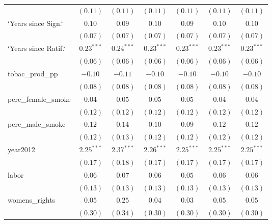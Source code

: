 \begin{table}[!h]
\begin{center}
\begin{tabular}{l c c c c c c }
                        & $(0.11)$     & $(0.11)$     & $(0.11)$     & $(0.11)$     & $(0.11)$     & $(0.11)$     \\
`Years since Sign.`     & $0.10$       & $0.09$       & $0.10$       & $0.09$       & $0.10$       & $0.10$       \\
                        & $(0.07)$     & $(0.07)$     & $(0.07)$     & $(0.07)$     & $(0.07)$     & $(0.07)$     \\
`Years since Ratif.`    & $0.23^{***}$ & $0.24^{***}$ & $0.23^{***}$ & $0.23^{***}$ & $0.23^{***}$ & $0.23^{***}$ \\
                        & $(0.06)$     & $(0.06)$     & $(0.06)$     & $(0.06)$     & $(0.06)$     & $(0.06)$     \\
tobac\_prod\_pp         & $-0.10$      & $-0.11$      & $-0.10$      & $-0.10$      & $-0.10$      & $-0.10$      \\
                        & $(0.08)$     & $(0.08)$     & $(0.08)$     & $(0.08)$     & $(0.08)$     & $(0.08)$     \\
perc\_female\_smoke     & $0.04$       & $0.05$       & $0.05$       & $0.05$       & $0.04$       & $0.04$       \\
                        & $(0.12)$     & $(0.12)$     & $(0.12)$     & $(0.12)$     & $(0.12)$     & $(0.12)$     \\
perc\_male\_smoke       & $0.12$       & $0.14$       & $0.10$       & $0.09$       & $0.12$       & $0.12$       \\
                        & $(0.12)$     & $(0.13)$     & $(0.12)$     & $(0.12)$     & $(0.12)$     & $(0.12)$     \\
year2012                & $2.25^{***}$ & $2.37^{***}$ & $2.26^{***}$ & $2.25^{***}$ & $2.25^{***}$ & $2.25^{***}$ \\
                        & $(0.17)$     & $(0.18)$     & $(0.17)$     & $(0.17)$     & $(0.17)$     & $(0.17)$     \\
labor                   & $0.06$       & $0.07$       & $0.06$       & $0.05$       & $0.06$       & $0.06$       \\
                        & $(0.13)$     & $(0.13)$     & $(0.13)$     & $(0.13)$     & $(0.13)$     & $(0.13)$     \\
womens\_rights          & $0.05$       & $0.25$       & $0.04$       & $0.03$       & $0.05$       & $0.05$       \\
                        & $(0.30)$     & $(0.34)$     & $(0.30)$     & $(0.30)$     & $(0.30)$     & $(0.30)$     \\

\end{tabular}
\end{center}
\end{table}
